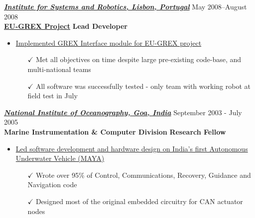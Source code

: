 \documentclass{res}
\begin{document}
\begin{resume}
{\sl \href{http://welcome.isr.ist.utl.pt/home/}{\textbf{Institute for Systems and Robotics, Lisbon, Portugal}}} \hfill May 2008--August 2008  \\[2pt]
\href{http://www.grex-project.eu/}{\textbf{EU-GREX Project}} \hfill   \textbf{ Lead Developer}
\begin{itemize}
 \item \href{http://robotics.usc.edu/~ampereir/wordpress/?page_id=397}{Implemented GREX Interface module for EU-GREX project}
   \begin{itemize} \item[$\checkmark$] Met all objectives on time despite large pre-existing code-base, and multi-national teams
   \item[$\checkmark$] All software was successfully tested - only team with working robot at field test in July
   \iftoggle{detailedVersion}{\begin{itemize}
   \item[\tiny$\blacksquare$]  Required Control Systems, Robotics, Ability to understand and implement complex algorithms quickly
   \item[\tiny$\blacksquare$]  Coded in Visual C++ .Net (Embedded Windows PC) and Matlab for prototyping
   \end{itemize}}{}
   \end{itemize}
   \end{itemize} 
   
   \vspace{-6pt}
 
{\sl \href{http://nio.org}{\textbf{National Institute of Oceanography, Goa, India}}}       \hfill               September 2003 - July 2005 \\[2pt]
\textbf{Marine Instrumentation \& Computer Division} \hfill \textbf{Research Fellow}
 \begin{itemize} 
 \item  \href{http://robotics.usc.edu/~ampereir/wordpress/?page_id=425}{Led software development and hardware design on India's first Autonomous Underwater Vehicle (MAYA)}
 \begin{itemize} 
 \item[$\checkmark$] Wrote over 95\% of Control, Communications, Recovery, Guidance and Navigation code
  \iftoggle{detailedVersion}{\begin{itemize}
   \item[\tiny$\blacksquare$]  Required Control Systems, Robotics, Computer Networking
   \item[\tiny$\blacksquare$]  Coded in C++ (Linux), Visual C++ (Windows) for Control GUI, C (micro controllers)and Matlab for prototyping
   \end{itemize}}{}
    \item[$\checkmark$] Designed most of the original embedded circuitry for CAN actuator nodes
 \end{itemize}
 

\end{itemize}
\end{resume}
\end{document}

